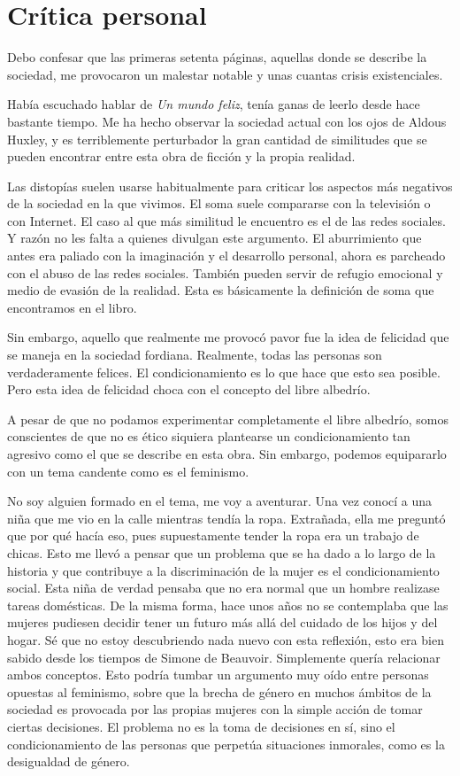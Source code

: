 \documentclass[11pt]{article}
\begin{document}
\newpage

\section{Crítica personal}

Debo confesar que las primeras setenta páginas, aquellas donde se describe la sociedad, me provocaron un malestar notable y unas cuantas crisis existenciales.

Había escuchado hablar de \textit{Un mundo feliz}, tenía ganas de leerlo desde hace bastante tiempo. Me ha hecho observar la sociedad actual con los ojos de Aldous Huxley, y es terriblemente perturbador la gran cantidad de similitudes que se pueden encontrar entre esta obra de ficción y la propia realidad.

Las distopías suelen usarse habitualmente para criticar los aspectos más negativos de la sociedad en la que vivimos. El soma suele compararse con la televisión o con Internet. El caso al que más similitud le encuentro es el de las redes sociales. Y razón no les falta a quienes divulgan este argumento. El aburrimiento que antes era paliado con la imaginación y el desarrollo personal, ahora es parcheado con el abuso de las redes sociales. También pueden servir de refugio emocional y medio de evasión de la realidad. Esta es básicamente la definición de soma que encontramos en el libro.

Sin embargo, aquello que realmente me provocó pavor fue la idea de felicidad que se maneja en la sociedad fordiana. Realmente, todas las personas son verdaderamente felices. El condicionamiento es lo que hace que esto sea posible. Pero esta idea de felicidad choca con el concepto del libre albedrío.

A pesar de que no podamos experimentar completamente el libre albedrío, somos conscientes de que no es ético siquiera plantearse un condicionamiento tan agresivo como el que se describe en esta obra. Sin embargo, podemos equipararlo con un tema candente como es el feminismo.

No soy alguien formado en el tema, me voy a aventurar. Una vez conocí a una niña que me vio en la calle mientras tendía la ropa. Extrañada, ella me preguntó que por qué hacía eso, pues supuestamente tender la ropa era un trabajo de chicas. Esto me llevó a pensar que un problema que se ha dado a lo largo de la historia y que contribuye a la discriminación de la mujer es el condicionamiento social. Esta niña de verdad pensaba que no era normal que un hombre realizase tareas domésticas. De la misma forma, hace unos años no se contemplaba que las mujeres pudiesen decidir tener un futuro más allá del cuidado de los hijos y del hogar. Sé que no estoy descubriendo nada nuevo con esta reflexión, esto era bien sabido desde los tiempos de Simone de Beauvoir. Simplemente quería relacionar ambos conceptos. Esto podría tumbar un argumento muy oído entre personas opuestas al feminismo, sobre que la brecha de género en muchos ámbitos de la sociedad es provocada por las propias mujeres con la simple acción de tomar ciertas decisiones. El problema no es la toma de decisiones en sí, sino el condicionamiento de las personas que perpetúa situaciones inmorales, como es la desigualdad de género.
\end{document}
